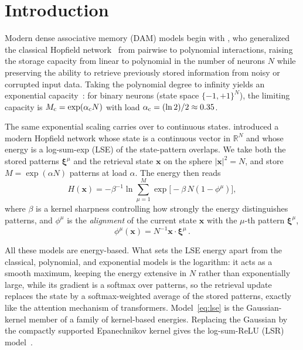 \documentclass[letterpaper]{article} %
\newcommand{\bxi}{\boldsymbol{\xi}}
\newcommand{\bx}{\bm{x}}
\newcommand{\Bnet}{\beta}
\begin{document}
\section{Introduction}

Modern dense associative memory (DAM) models begin with \citet{krotov2016dense},
who generalized the classical Hopfield network~\citep{Hopfield1982} from pairwise
to polynomial interactions, raising the storage capacity from linear to
polynomial in the number of neurons $N$ while preserving the ability to
retrieve previously stored information from noisy or corrupted input data. 
Taking the polynomial degree to infinity yields an exponential capacity~\citep{demircigil2017model}:
for binary neurons (state space $\{-1,+1\}^{N}$), the limiting capacity is
$M_{\rm c} = \exp(\alpha_{\rm c} N)$ with load $\alpha_{\rm c} = (\ln 2)/2 \approx 0.35$.

The same exponential scaling carries over to continuous states.
\citet{ramsauer2021hopfield} introduced a modern Hopfield network whose state is
a continuous vector in $\mathbb{R}^N$ and whose energy is a log-sum-exp (LSE) of the state-pattern
overlaps. We take both the stored patterns $\bxi^\mu$ and the retrieval state
$\bx$ on the sphere $|\bx|^2 = N$, and store $M = \exp(\alpha N)$ patterns at load $\alpha$. 
The energy then reads
\begin{equation}
H(\bx) = -\Bnet^{-1}\ln\sum_{\mu=1}^{M}\exp\!\big[-\Bnet\,N (1-\phi^\mu) \big],
\label{eq:lse}
\end{equation}
where $\Bnet$ is a kernel sharpness controlling how strongly the energy
distinguishes patterns, and $\phi^\mu$ is the \textit{alignment} of the current state $\bx$ 
with the $\mu$-th pattern $\bxi^\mu$,
\begin{equation}
    \phi^\mu(\bm{x}) = N^{-1} \bm{x} \cdot \bm{\xi}^\mu\,.
    \label{eq:alignment}
\end{equation}

All these models are energy-based. What sets the LSE energy apart from 
the classical, polynomial, and exponential models is the logarithm: 
it acts as a smooth maximum, keeping the energy extensive in $N$
rather than exponentially large, while its gradient is a softmax over patterns,
so the retrieval update replaces the state by a softmax-weighted average of the
stored patterns, exactly like the attention mechanism of transformers.
Model~\eqref{eq:lse} is the Gaussian-kernel member of a family of kernel-based
energies. Replacing the Gaussian by the compactly
supported Epanechnikov kernel gives the log-sum-ReLU (LSR)
model~\citep{hoover2025dense}.
\end{document}
